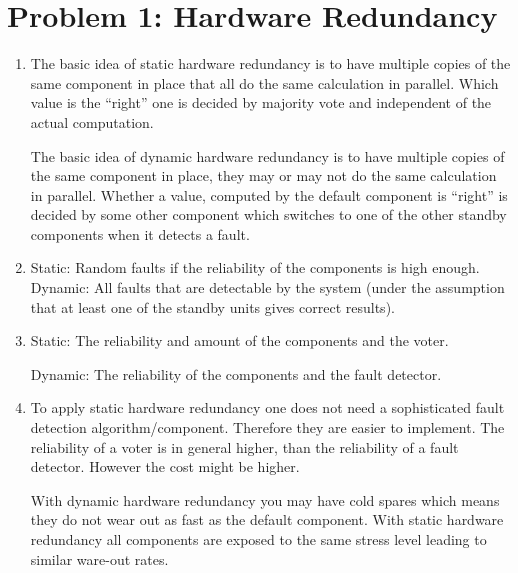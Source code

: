 \documentclass[a4paper,parskip,headheight=38pt]{scrartcl} %
\begin{document}
\section*{Problem 1: Hardware Redundancy}
\begin{enumerate}
\item The basic idea of static hardware redundancy is to have multiple copies of the same component in place that all do the same calculation in parallel. Which value is the \enquote{right} one is decided by majority vote and independent of the actual computation.

The basic idea of dynamic hardware redundancy is to have multiple copies of the same component in place, they may or may not do the same calculation in parallel. Whether a value, computed by the default component is \enquote{right} is decided by some other component which switches to one of the other standby components when it detects a fault.

\item Static: Random faults if the reliability of the components is high enough. Dynamic: All faults that are detectable by the system (under the assumption that at least one of the standby units gives correct results).

\item Static: The reliability and amount of the components and the voter.

Dynamic: The reliability of the components and the fault detector.

\item To apply static hardware redundancy one does not need a sophisticated fault detection algorithm/component. Therefore they are easier to implement. The reliability of a voter is in general higher, than the reliability of a fault detector. However the cost might be higher.

With dynamic hardware redundancy you may have cold spares which means they do not wear out as fast as the default component. With static hardware redundancy all components are exposed to the same stress level leading to similar ware-out rates.
\end{enumerate}
\end{document}

